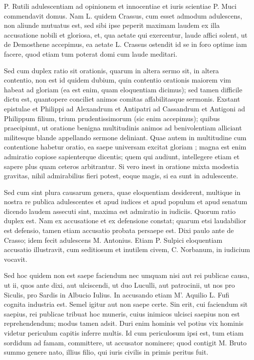  P. Rutili adulescentiam ad opinionem et innocentiae et iuris scientiae P. Muci commendavit domus. Nam L. quidem Crassus, cum esset admodum adulescens, non aliunde mutuatus est, sed sibi ipse peperit maximam laudem ex illa accusatione nobili et gloriosa, et, qua aetate qui exercentur, laude affici solent, ut de Demosthene accepimus, ea aetate L. Crassus ostendit id se in foro optime iam facere, quod etiam tum poterat domi cum laude meditari.

 Sed cum duplex ratio sit orationis, quarum in altera sermo sit, in altera contentio, non est id quidem dubium, quin contentio orationis maiorem vim habeat ad gloriam (ea est enim, quam eloquentiam dicimus); sed tamen difficile dictu est, quantopere conciliet animos comitas affabilitasque sermonis. Exstant epistulae et Philippi ad Alexandrum et Antipatri ad Cassandrum et Antigoni ad Philippum filium, trium prudentissimorum (sic enim accepimus); quibus praecipiunt, ut oratione benigna multitudinis animos ad benivolentiam alliciant militesque blande appellando sermone deliniant. Quae autem in multitudine cum contentione habetur oratio, ea saepe universam excitat gloriam ; magna est enim admiratio copiose sapienterque dicentis; quem qui audiunt, intellegere etiam et sapere plus quam ceteros arbitrantur. Si vero inest in oratione mixta modestia gravitas, nihil admirabilius fieri potest, eoque magis, si ea sunt in adulescente.

 Sed cum sint plura causarum genera, quae eloquentiam desiderent, multique in nostra re publica adulescentes et apud iudices et apud populum et apud senatum dicendo laudem assecuti sint, maxima est admiratio in iudiciis. Quorum ratio duplex est. Nam ex accusatione et ex defensione constat; quarum etsi laudabilior est defensio, tamen etiam accusatio probata persaepe est. Dixi paulo ante de Crasso; idem fecit adulescens M. Antonius. Etiam P. Sulpici eloquentiam accusatio illustravit, cum seditiosum et inutilem civem, C. Norbanum, in iudicium vocavit.

 Sed hoc quidem non est saepe faciendum nec umquam nisi aut rei publicae causa, ut ii, quos ante dixi, aut ulciscendi, ut duo Luculli, aut patrocinii, ut nos pro Siculis, pro Sardis in Albucio Iulius. In accusando etiam M'. Aquilio L. Fufi cognita industria est. Semel igitur aut non saepe certe. Sin erit, cui faciendum sit saepius, rei publicae tribuat hoc muneris, cuius inimicos ulcisci saepius non est reprehendendum; modus tamen adsit. Duri enim hominis vel potius vix hominis videtur periculum capitis inferre multis. Id cum periculosum ipsi est, tum etiam sordidum ad famam, committere, ut accusator nominere; quod contigit M. Bruto summo genere nato, illius filio, qui iuris civilis in primis peritus fuit.

